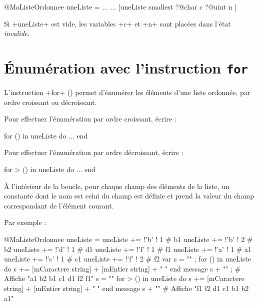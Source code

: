 \begin{galgas3}
@MaListeOrdonnee uneListe = ...
...
[uneListe smallest
  ?@char c
  ?@uint n
]
\end{galgas3}

Si \ggst+uneListe+ est vide, les variables \ggst+c+ et \ggst+n+ sont placées dans l'état \emph{invalide}.




\section{Énumération avec l'instruction \texttt{for}}

L'instruction \ggst+for+ () permet d'énumérer les éléments d'une liste ordonnée, par ordre croissant ou décroissant.

Pour effectuer l'énumération par ordre croissant, écrire :
\begin{galgas3}
for () in uneListe do
  ...
end
\end{galgas3}

Pour effectuer l'énumération par ordre décroissant, écrire :
\begin{galgas3}
for > () in uneListe do
  ...
end
\end{galgas3}

À l'intérieur de la boucle, pour chaque champ des éléments de la liste, un constante dont le nom est celui du champ est définie et prend la valeur du champ correspondant de l'élément courant.

Par exemple :

\begin{galgas3}
@MaListeOrdonnee uneListe = {}
uneListe += !'b' ! 1 # b1
uneListe += !'b' ! 2 # b2
uneListe += !'d' ! 1 # d1
uneListe += !'f' ! 1 # f1
uneListe += !'a' ! 1 # a1
uneListe += !'c' ! 1 # c1
uneListe += !'f' ! 2 # f2
var s = "" ;
for () in uneListe do
  s += [mCaractere string] + [mEntier string] + " "
end
message s + "\n" ; # Affiche "a1 b2 b1 c1 d1 f2 f1"
s = ""
for > () in uneListe do
  s += [mCaractere string] + [mEntier string] + " "
end
message s + "\n" # Affiche "f1 f2 d1 c1 b1 b2 a1"
\end{galgas3}
